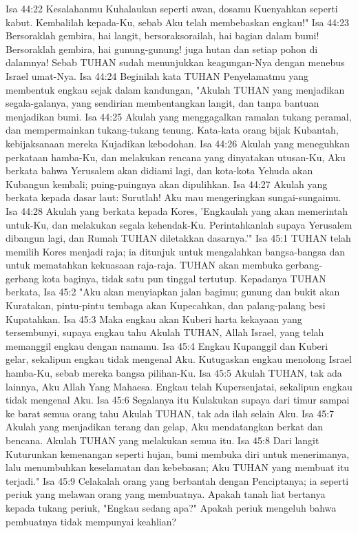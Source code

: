Isa 44:22  Kesalahanmu Kuhalaukan seperti awan, dosamu Kuenyahkan seperti kabut. Kembalilah kepada-Ku, sebab Aku telah membebaskan engkau!"
Isa 44:23  Bersoraklah gembira, hai langit, bersoraksorailah, hai bagian dalam bumi! Bersoraklah gembira, hai gunung-gunung! juga hutan dan setiap pohon di dalamnya! Sebab TUHAN sudah menunjukkan keagungan-Nya dengan menebus Israel umat-Nya.
Isa 44:24  Beginilah kata TUHAN Penyelamatmu yang membentuk engkau sejak dalam kandungan, "Akulah TUHAN yang menjadikan segala-galanya, yang sendirian membentangkan langit, dan tanpa bantuan menjadikan bumi.
Isa 44:25  Akulah yang menggagalkan ramalan tukang peramal, dan mempermainkan tukang-tukang tenung. Kata-kata orang bijak Kubantah, kebijaksanaan mereka Kujadikan kebodohan.
Isa 44:26  Akulah yang meneguhkan perkataan hamba-Ku, dan melakukan rencana yang dinyatakan utusan-Ku, Aku berkata bahwa Yerusalem akan didiami lagi, dan kota-kota Yehuda akan Kubangun kembali; puing-puingnya akan dipulihkan.
Isa 44:27  Akulah yang berkata kepada dasar laut: Surutlah! Aku mau mengeringkan sungai-sungaimu.
Isa 44:28  Akulah yang berkata kepada Kores, 'Engkaulah yang akan memerintah untuk-Ku, dan melakukan segala kehendak-Ku. Perintahkanlah supaya Yerusalem dibangun lagi, dan Rumah TUHAN diletakkan dasarnya.'"
Isa 45:1  TUHAN telah memilih Kores menjadi raja; ia ditunjuk untuk mengalahkan bangsa-bangsa dan untuk mematahkan kekuasaan raja-raja. TUHAN akan membuka gerbang-gerbang kota baginya, tidak satu pun tinggal tertutup. Kepadanya TUHAN berkata,
Isa 45:2  "Aku akan menyiapkan jalan bagimu; gunung dan bukit akan Kuratakan, pintu-pintu tembaga akan Kupecahkan, dan palang-palang besi Kupatahkan.
Isa 45:3  Maka engkau akan Kuberi harta kekayaan yang tersembunyi, supaya engkau tahu Akulah TUHAN, Allah Israel, yang telah memanggil engkau dengan namamu.
Isa 45:4  Engkau Kupanggil dan Kuberi gelar, sekalipun engkau tidak mengenal Aku. Kutugaskan engkau menolong Israel hamba-Ku, sebab mereka bangsa pilihan-Ku.
Isa 45:5  Akulah TUHAN, tak ada lainnya, Aku Allah Yang Mahaesa. Engkau telah Kupersenjatai, sekalipun engkau tidak mengenal Aku.
Isa 45:6  Segalanya itu Kulakukan supaya dari timur sampai ke barat semua orang tahu Akulah TUHAN, tak ada ilah selain Aku.
Isa 45:7  Akulah yang menjadikan terang dan gelap, Aku mendatangkan berkat dan bencana. Akulah TUHAN yang melakukan semua itu.
Isa 45:8  Dari langit Kuturunkan kemenangan seperti hujan, bumi membuka diri untuk menerimanya, lalu menumbuhkan keselamatan dan kebebasan; Aku TUHAN yang membuat itu terjadi."
Isa 45:9  Celakalah orang yang berbantah dengan Penciptanya; ia seperti periuk yang melawan orang yang membuatnya. Apakah tanah liat bertanya kepada tukang periuk, "Engkau sedang apa?" Apakah periuk mengeluh bahwa pembuatnya tidak mempunyai keahlian?
